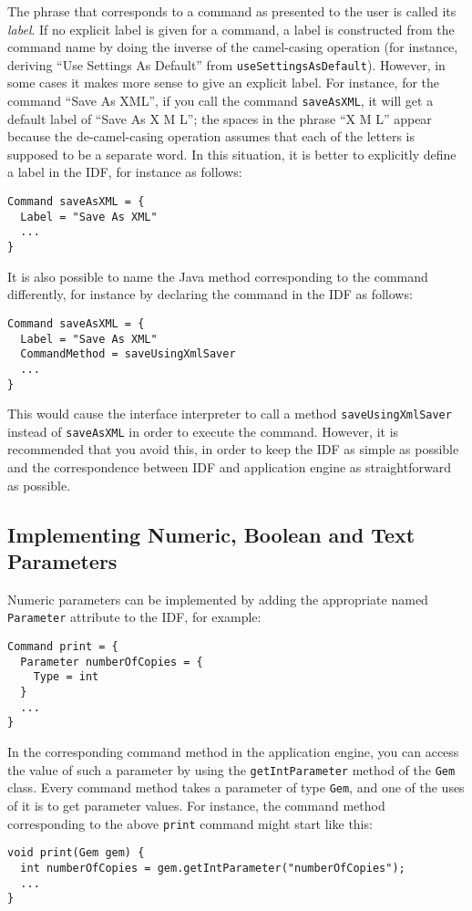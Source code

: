 \documentclass[11pt]{report}
\begin{document}
The phrase that corresponds to a command as presented to the user
is called its {\it label}.  If no explicit label is given for a
command, a label is constructed from the command name by doing the
inverse of the camel-casing operation (for instance, deriving
``Use Settings As Default'' from {\tt useSettingsAsDefault}).
However, in some cases
it makes more sense to give an explicit label.
For instance, for the command ``Save As XML'',
if you call the command {\tt saveAsXML}, it will get a default
label of ``Save As X M L''; the spaces in the phrase ``X M L''
appear because the de-camel-casing operation assumes that each
of the letters is supposed to be a separate word.  In this situation,
it is better to explicitly define a label in the IDF, for instance as
follows:
\begin{verbatim}
Command saveAsXML = {
  Label = "Save As XML"
  ...
}
\end{verbatim}

It is also possible to name the Java method corresponding to the
command differently, for instance by declaring the command in the IDF
as follows:
\begin{verbatim}
Command saveAsXML = {
  Label = "Save As XML"
  CommandMethod = saveUsingXmlSaver
  ...
}
\end{verbatim}
This would cause the interface interpreter to call a method
{\tt saveUsingXmlSaver} instead of {\tt saveAsXML} in order to
execute the command.  However, it is recommended that you avoid
this, in order to keep the IDF as simple as possible and the
correspondence between IDF and application engine as straightforward
as possible.

\subsection{Implementing Numeric, Boolean and Text Parameters}

Numeric parameters can be implemented by adding the appropriate
named {\tt Parameter} attribute to the IDF, for example:
\begin{verbatim}
Command print = {
  Parameter numberOfCopies = {
    Type = int
  }
  ...
}
\end{verbatim}
In the corresponding command method in the application engine,
you can access the value of such a parameter by using the
{\tt getIntParameter} method of the {\tt Gem} class.
Every command method takes a parameter of type {\tt Gem},
and one of the uses of it is to get parameter values.
For instance, the command method corresponding to the above
{\tt print} command might start like this:
\begin{verbatim}
void print(Gem gem) {
  int numberOfCopies = gem.getIntParameter("numberOfCopies");
  ...
}
\end{verbatim}
\end{document}
